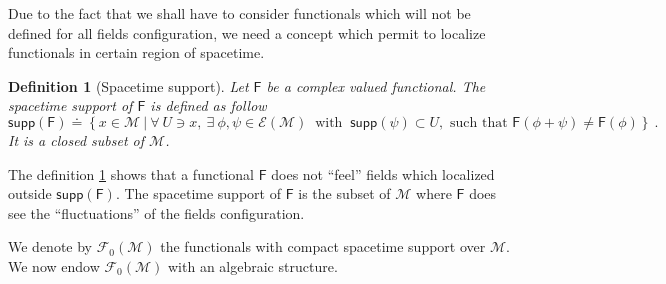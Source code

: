 \documentclass[10pt]{book}
\newcommand{\supp}{\mathsf{supp}}
\newcommand{\Ecal}{\mathcal{E}}
\newcommand{\Fcal}{\mathcal{F}}
\newcommand{\Mcal}{\mathcal{M}}
\newcommand{\Fsf}{\mathsf{F}}
\theoremstyle{break}
\newtheorem{definition}{Definition}
\begin{document}
\bigskip


Due to the fact that we shall have to consider functionals which will not be defined for all fields configuration, we need a concept which permit to localize functionals in certain region of spacetime.


\begin{definition}[Spacetime support] \label{def:spacetime-supp}
Let $\Fsf$ be a complex valued functional. The spacetime support of $\Fsf$ is defined as follow
%
\begin{equation*}
\supp(\Fsf) \doteq \left\{ x \in \Mcal \ \bigg| \ 
\forall \ U \ni x , \ \exists \ \phi, \psi \in \Ecal(\Mcal) \ \mbox{ with } \ \supp(\psi) \subset U, \mbox{ such that } \Fsf(\phi + \psi) \neq \Fsf(\phi)
\right\} \ .
\end{equation*}
It is a closed subset of $\Mcal$.
%
\end{definition}


The definition \ref{def:spacetime-supp} shows that a functional $\Fsf$ does not ``feel'' fields which localized outside $\supp(\Fsf)$. The spacetime support of $\Fsf$ is the subset of $\Mcal$ where $\Fsf$ does see the ``fluctuations'' of the fields configuration.




\bigskip


We denote by $\Fcal_0(\Mcal)$ the functionals with compact spacetime support over $\Mcal$. We now endow $\Fcal_0(\Mcal)$ with an algebraic structure. 
\end{document}

